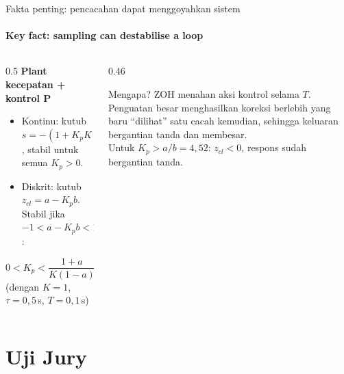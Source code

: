 \documentclass[aspectratio=169,10pt]{beamer}
\begin{document}
\begin{frame}{Fakta penting: pencacahan dapat menggoyahkan sistem}
	\framesubtitle{Key fact: sampling can destabilise a loop}
	\begin{columns}[T]
		\begin{column}{0.5\textwidth}
			\small
			\textbf{Plant kecepatan + kontrol P}
			\begin{itemize}
				\item Kontinu: kutub $s = -(1+K_pK)/\tau$, \alert{stabil untuk semua} $K_p > 0$.
				\item Diskrit: kutub $z_{cl} = a - K_pb$. Stabil jika $-1 < a - K_pb < 1$:
			\end{itemize}
			\[
				0 < K_p < \frac{1+a}{K(1-a)} = \frac{1{,}8187}{0{,}1813} = 10{,}03
			\]
			{\scriptsize (dengan $K=1$, $\tau=0{,}5$\,s, $T=0{,}1$\,s)}
		\end{column}
		\begin{column}{0.46\textwidth}
			\begin{alertblock}{Mengapa?}
				\small
				ZOH menahan aksi kontrol selama $T$. Penguatan besar menghasilkan koreksi berlebih yang baru ``dilihat'' satu cacah kemudian, sehingga keluaran bergantian tanda dan membesar.\\[3pt]
				Untuk $K_p > a/b = 4{,}52$: $z_{cl} < 0$, respons sudah bergantian tanda.
			\end{alertblock}
		\end{column}
	\end{columns}
\end{frame}

\section{Uji Jury\texorpdfstring{\\[4pt]{\Large{}}}{ / The Jury Test}}
\end{document}
